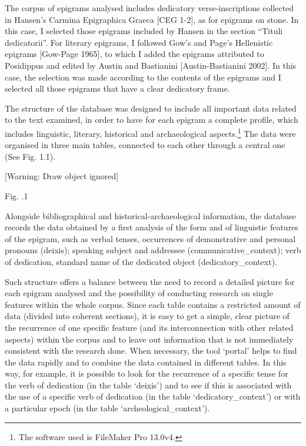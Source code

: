\documentclass[amsthm,ebook]{saparticle}
\begin{document}
The corpus of epigrams analysed includes dedicatory verse-inscriptions collected in Hansen’s Carmina Epigraphica Graeca
[CEG 1-2], as for epigrams on stone. In this case, I selected those epigrams included by Hansen in the section “Tituli
dedicatorii”. For literary epigrams, I followed Gow’s and Page’s Hellenistic epigrams [Gow-Page 1965], to which I added
the epigrams attributed to Posidippus and edited by Austin and Bastianini [Austin-Bastianini 2002]. In this case, the
selection was made according to the contents of the epigrams and I selected all those epigrams that have a clear
dedicatory frame.

The structure of the database was designed to include all important data related to the text examined, in order to have
for each epigram a complete profile, which includes linguistic, literary, historical and archaeological
aspects.\footnote{ The software used is FileMaker Pro 13.0v4.} The data were organised in three main tables, connected
to each other through a central one (See Fig. 1.1). 

[Warning: Draw object ignored]

Fig. .1

Alongside bibliographical and historical-archaeological information, the database records the data obtained by a first
analysis of the form and of linguistic features of the epigram, such as verbal tenses, occurrences of demonstrative and
personal pronouns (deixis); speaking subject and addressee (communicative\_context); verb of dedication, standard name
of the dedicated object (dedicatory\_context).

Such structure offers a balance between the need to record a detailed picture for each epigram analysed and the
possibility of conducting research on single features within the whole corpus. Since each table contains a restricted
amount of data (divided into coherent sections), it is easy to get a simple, clear picture of the recurrence of one
specific feature (and its interconnection with other related aspects) within the corpus and to leave out information
that is not immediately consistent with the research done. When necessary, the tool ‘portal’ helps to find the data
rapidly and to combine the data contained in different tables. In this way, for example, it is possible to look for the
recurrence of a specific tense for the verb of dedication (in the table ‘deixis’) and to see if this is associated with
the use of a specific verb of dedication (in the table ‘dedicatory\_context’) or with a particular epoch (in the table
‘archeological\_context’).
\end{document}
